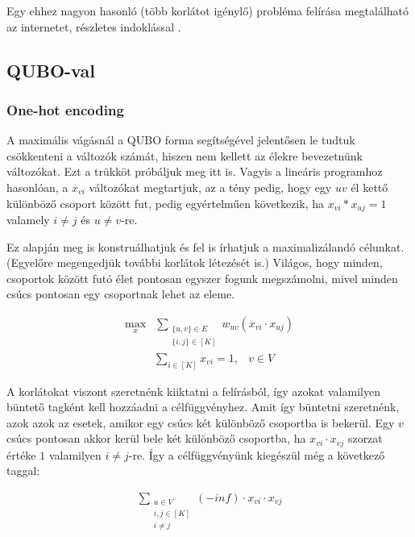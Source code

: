 Egy ehhez nagyon hasonló (több korlátot igénylő) probléma felírása megtalálható az internetet, részletes indoklással \cite{Hojny2021}. 

\subsection{QUBO-val}

\subsubsection{One-hot encoding}

A maximális vágásnál a QUBO forma segítségével jelentősen le tudtuk csökkenteni a változók számát, hiszen nem kellett az élekre bevezetnünk változókat. Ezt a trükköt próbáljuk meg itt is.
Vagyis a lineáris programhoz hasonlóan, a $x_{vi}$ változókat megtartjuk, az a tény pedig, hogy egy $uv$ él kettő különböző csoport között fut, pedig egyértelműen következik, ha $x_{vi}*x_{uj}=1$ valamely $i \neq j$ és $u \neq v$-re.

Ez alapján meg is konstruálhatjuk és fel is írhatjuk a maximalizálandó célunkat. (Egyelőre megengedjük további korlátok létezését is.) Világos, hogy minden, csoportok között futó élet pontosan egyszer fogunk megszámolni, mivel minden csúcs pontosan egy csoportnak lehet az eleme.

\begin{align} \max_{x} &\sum _{\substack{\{{u,v}\} \in E \\ \{{i,j}\} \in [K]}} w_{uv}(x_{vi} \cdot x_{uj}) \end{align}
\begin{align} &\sum _{i \in [K]} x_{vi} = 1, &v \in V \end {align}

A korlátokat viszont szeretnénk kiiktatni a felírásból, így azokat valamilyen büntető tagként kell hozzáadni a célfüggvényhez. Amit így büntetni szeretnénk, azok azok az esetek, amikor egy csúcs két különböző csoportba is bekerül. Egy $v$ csúcs pontosan akkor kerül bele két különböző csoportba, ha $x_{vi}\cdot x_{vj}$ szorzat értéke $1$ valamilyen $i \neq j$-re. Így a célfüggvényünk kiegészül még a következő taggal:

\begin{align} \sum _{\substack{u \in V \\ i,j \in [K] \\  i \neq j}} (-inf) \cdot x_{vi} \cdot x_{vj} \end{align}

